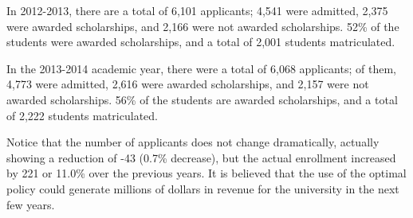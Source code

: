 \documentclass[12pt,english]{report}
\begin{document}
In 2012-2013, there are a total of 6,101 applicants; 4,541  were admitted, 2,375 were awarded scholarships, and 2,166 were not awarded scholarships. 52\% of the students were awarded scholarships, and a total of 2,001 students matriculated.

In the 2013-2014 academic year, there were a total of 6,068 applicants; of them, 4,773 were admitted, 2,616 were awarded scholarships, and 2,157 were not awarded scholarships. 56\% of the students are awarded scholarships, and a total of 2,222 students matriculated.

Notice that the number of applicants does not change dramatically, actually showing a reduction of -43 (0.7\% decrease), but the actual enrollment increased by 221  or 11.0\% over the previous years.  It is believed that the use of the optimal policy could generate millions of dollars  in revenue for the university in the next few years.

\end{document}
